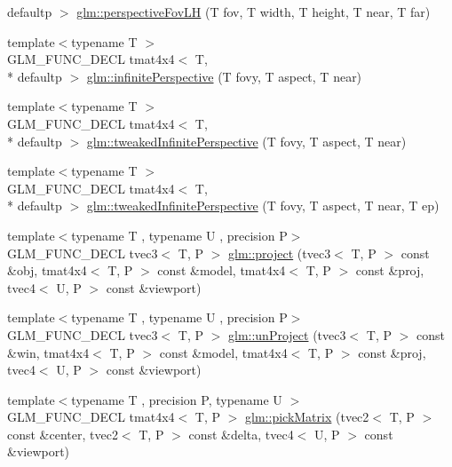\begin{DoxyCompactItemize}
defaultp $>$ \hyperlink{group__gtc__matrix__transform_gae705a2f19c3ef5ef880bd6c92759cf2d}{glm\-::perspective\-Fov\-L\-H} (T fov, T width, T height, T near, T far)
\item 
{\footnotesize template$<$typename T $>$ }\\G\-L\-M\-\_\-\-F\-U\-N\-C\-\_\-\-D\-E\-C\-L tmat4x4$<$ T, \\*
defaultp $>$ \hyperlink{group__gtc__matrix__transform_ga79f704ad91a5f0d68abd88c66c8186e5}{glm\-::infinite\-Perspective} (T fovy, T aspect, T near)
\item 
{\footnotesize template$<$typename T $>$ }\\G\-L\-M\-\_\-\-F\-U\-N\-C\-\_\-\-D\-E\-C\-L tmat4x4$<$ T, \\*
defaultp $>$ \hyperlink{group__gtc__matrix__transform_gaed64bd81f5ecdab52fecbdf7f6b58194}{glm\-::tweaked\-Infinite\-Perspective} (T fovy, T aspect, T near)
\item 
{\footnotesize template$<$typename T $>$ }\\G\-L\-M\-\_\-\-F\-U\-N\-C\-\_\-\-D\-E\-C\-L tmat4x4$<$ T, \\*
defaultp $>$ \hyperlink{group__gtc__matrix__transform_gaa50fce7f50b5d5da881ed30f5532a921}{glm\-::tweaked\-Infinite\-Perspective} (T fovy, T aspect, T near, T ep)
\item 
{\footnotesize template$<$typename T , typename U , precision P$>$ }\\G\-L\-M\-\_\-\-F\-U\-N\-C\-\_\-\-D\-E\-C\-L tvec3$<$ T, P $>$ \hyperlink{group__gtc__matrix__transform_gad743556abd138264d4f06f4ca27f1d7e}{glm\-::project} (tvec3$<$ T, P $>$ const \&obj, tmat4x4$<$ T, P $>$ const \&model, tmat4x4$<$ T, P $>$ const \&proj, tvec4$<$ U, P $>$ const \&viewport)
\item 
{\footnotesize template$<$typename T , typename U , precision P$>$ }\\G\-L\-M\-\_\-\-F\-U\-N\-C\-\_\-\-D\-E\-C\-L tvec3$<$ T, P $>$ \hyperlink{group__gtc__matrix__transform_ga82a558de3ce42cbeed0f6ec292a4e1b3}{glm\-::un\-Project} (tvec3$<$ T, P $>$ const \&win, tmat4x4$<$ T, P $>$ const \&model, tmat4x4$<$ T, P $>$ const \&proj, tvec4$<$ U, P $>$ const \&viewport)
\item 
{\footnotesize template$<$typename T , precision P, typename U $>$ }\\G\-L\-M\-\_\-\-F\-U\-N\-C\-\_\-\-D\-E\-C\-L tmat4x4$<$ T, P $>$ \hyperlink{group__gtc__matrix__transform_ga9026c77505b99990f68826f27c267dc5}{glm\-::pick\-Matrix} (tvec2$<$ T, P $>$ const \&center, tvec2$<$ T, P $>$ const \&delta, tvec4$<$ U, P $>$ const \&viewport)

\end{DoxyCompactItemize}
